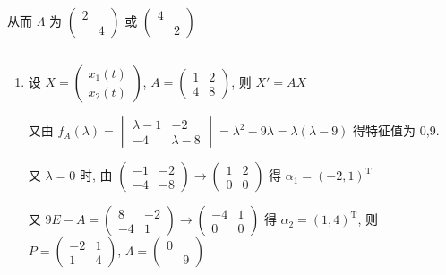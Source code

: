 		 从而 \( \Lambda \) 为 \( \begin{pmatrix}
			 2 &   \\
			   & 4
		 \end{pmatrix} \) 或 \( \begin{pmatrix}
			 4 &   \\
			   & 2
		 \end{pmatrix} \)


 \subsection{} %

	 \paragraph{} %
		 \begin{enumerate}
			 \item %
			       设 \( X = \begin{pmatrix}
				       x_{1}(t) \\
				       x_{2}(t)
			       \end{pmatrix} \), \( A = \begin{pmatrix}
				       1 & 2 \\
				       4 & 8
			       \end{pmatrix} \), 则 \( X' = AX \)

			       又由 \( f_{A}(\lambda) = \begin{vmatrix}
				       \lambda-1 & -2        \\
				       -4        & \lambda-8
			       \end{vmatrix} = \lambda^{2}-9\lambda = \lambda(\lambda-9) \) 得特征值为 0,9.

			       又 \( \lambda=0 \) 时, 由 \( \begin{pmatrix}
				       -1 & -2 \\
				       -4 & -8
			       \end{pmatrix} \rightarrow \begin{pmatrix}
				       1 & 2 \\
				       0 & 0
			       \end{pmatrix} \) 得 \( \alpha_{1} = (-2, 1)^{\mathrm{T}} \)

			       又 \( 9E-A = \begin{pmatrix}
				       8  & -2 \\
				       -4 & 1
			       \end{pmatrix} \rightarrow \begin{pmatrix}
				       -4 & 1 \\
				       0  & 0
			       \end{pmatrix} \) 得 \( \alpha_{2} = (1, 4)^{\mathrm{T}} \), 则 \( P = \begin{pmatrix}
				       -2 & 1 \\
				       1  & 4
			       \end{pmatrix} \), \( \Lambda = \begin{pmatrix}
				       0 &   \\
				         & 9
			       \end{pmatrix} \)


\end{enumerate}
